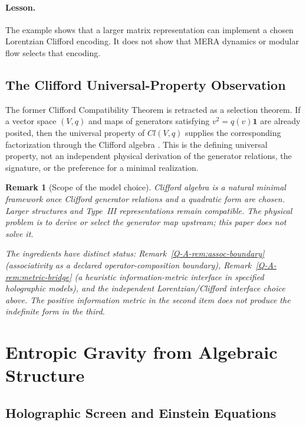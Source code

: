 \documentclass[12pt,a4paper,openany]{book}
\newtheorem{remark}[theorem]{Remark}
\begin{document}
\paragraph{Lesson.}
The example shows that a larger matrix representation can implement a chosen Lorentzian Clifford encoding.  It does not show that MERA dynamics or modular flow selects that encoding.

\subsection{The Clifford Universal-Property Observation}

The former Clifford Compatibility Theorem is retracted as a selection theorem.  If a vector space $(V,q)$ and maps of generators satisfying $v^2=q(v)\mathbf1$ are already posited, then the universal property of $Cl(V,q)$ supplies the corresponding factorization through the Clifford algebra \cite{Hestenes1966,Doran2003}.  This is the defining universal property, not an independent physical derivation of the generator relations, the signature, or the preference for a minimal realization.

\begin{remark}[Scope of the model choice]
\label{Q-A-rem:scope}
Clifford algebra is a natural minimal framework once Clifford generator relations and a quadratic form are chosen.  Larger structures and Type~III representations remain compatible.  The physical problem is to derive or select the generator map upstream; this paper does not solve it.

The ingredients have distinct status:
Remark~\ref{Q-A-rem:assoc-boundary} (associativity as a declared operator-composition boundary),
Remark~\ref{Q-A-rem:metric-bridge} (a heuristic information-metric interface in specified holographic models),
and the independent Lorentzian/Clifford interface choice above.  The positive information metric in the second item does not produce the indefinite form in the third.
\end{remark}

\section{Entropic Gravity from Algebraic Structure}
\label{Q-A-sec:entropic}

\subsection{Holographic Screen and Einstein Equations}
\end{document}
